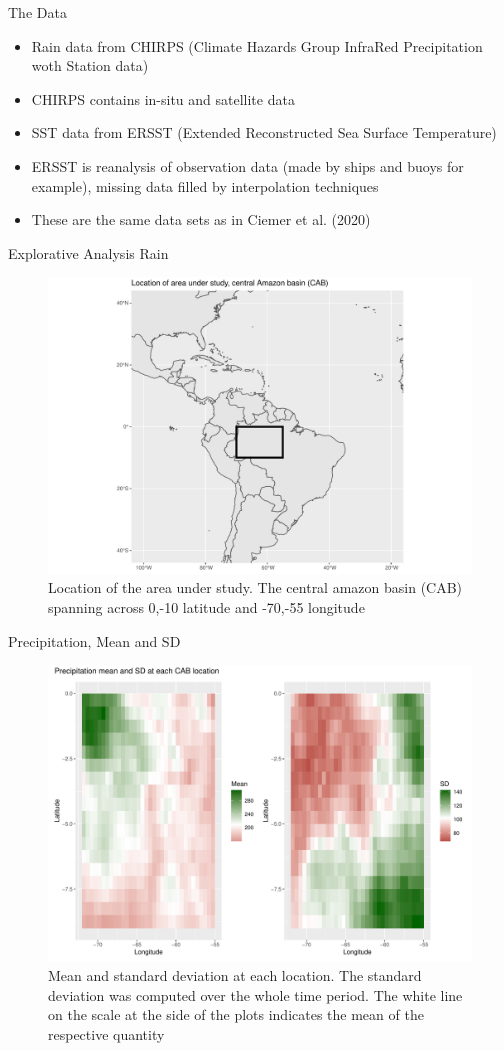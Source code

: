 \documentclass[
  ignorenonframetext,
]{beamer}
\providecommand{\tightlist}{%
  \setlength{\itemsep}{0pt}\setlength{\parskip}{0pt}}
\begin{document}
\begin{frame}{The Data}
\protect\hypertarget{the-data}{}
\begin{itemize}
\tightlist
\item
  Rain data from CHIRPS (Climate Hazards Group InfraRed Precipitation
  woth Station data)
\item
  CHIRPS contains in-situ and satellite data
\item
  SST data from ERSST (Extended Reconstructed Sea Surface Temperature)
\item
  ERSST is reanalysis of observation data (made by ships and buoys for
  example), missing data filled by interpolation techniques
\item
  These are the same data sets as in Ciemer et al. (2020)
\end{itemize}
\end{frame}

\begin{frame}{Explorative Analysis Rain}
\protect\hypertarget{explorative-analysis-rain}{}
\begin{figure}

{\centering \includegraphics[width=0.5\linewidth]{ma-presentation_files/figure-beamer/CAB-1} 

}

\caption{Location of the area under study. The central amazon basin (CAB) spanning across 0,-10 latitude and -70,-55 longitude}\label{fig:CAB}
\end{figure}
\end{frame}

\begin{frame}{Precipitation, Mean and SD}
\protect\hypertarget{precipitation-mean-and-sd}{}
\begin{figure}

{\centering \includegraphics[width=0.5\linewidth]{ma-presentation_files/figure-beamer/mean-sd-precip-1} 

}

\caption{Mean and standard deviation at each location. The standard deviation was computed over the whole time period. The white line on the scale at the side of the plots indicates the mean of the respective quantity}\label{fig:mean-sd-precip}
\end{figure}
\end{frame}
\end{document}
